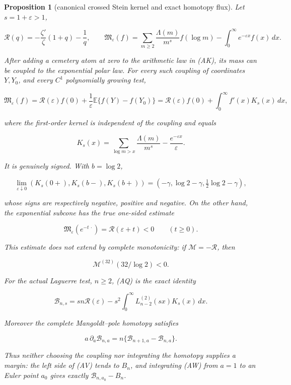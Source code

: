 \documentclass[11pt]{amsart}
\newtheorem{proposition}[theorem]{Proposition}
\theoremstyle{definition}
\theoremstyle{remark}
\theoremstyle{definition}
\begin{document}
\begin{proposition}[canonical crossed Stein kernel and exact homotopy flux]
\label{prop:a1-crossed-stein-flow}
Let $s=1+\varepsilon>1$,

\[
 \mathcal R(q)=-\frac{\zeta'}\zeta(1+q)-\frac1q,
 \qquad
 \mathfrak M_\varepsilon(f)
 =\sum_{m\ge2}\frac{\Lambda(m)}{m^s}f(\log m)
  -\int_0^\infty e^{-\varepsilon x}f(x)\,dx .              \tag{AP}
\]

After adding a cemetery atom at zero to the arithmetic law in (AK), its
mass can be coupled to the exponential polar law.  For every such coupling
of coordinates $Y,Y_0$, and every $C^1$ polynomially growing test,

\[
 \mathfrak M_\varepsilon(f)
 =\mathcal R(\varepsilon)f(0)
   +\frac1\varepsilon\mathbb E\{f(Y)-f(Y_0)\}
 =\mathcal R(\varepsilon)f(0)+\int_0^\infty f'(x)K_s(x)\,dx, \tag{AQ}
\]

where the first-order kernel is independent of the coupling and equals

\[
 K_s(x)=\sum_{\log m>x}\frac{\Lambda(m)}{m^s}
       -\frac{e^{-\varepsilon x}}\varepsilon .             \tag{AR}
\]

It is genuinely signed.  With $b=\log2$,

\[
 \lim_{\varepsilon\downarrow0}
 (K_s(0+),K_s(b-),K_s(b+))
 =(-\gamma,\log2-\gamma,\tfrac12\log2-\gamma),            \tag{AS}
\]

whose signs are respectively negative, positive and negative.  On the
other hand, the exponential subcone has the true one-sided estimate

\[
 \mathfrak M_\varepsilon(e^{-t\,\cdot})
 =\mathcal R(\varepsilon+t)<0\qquad(t\ge0).                \tag{AT}
\]

This estimate does not extend by complete monotonicity: if
$\mathcal M=-\mathcal R$, then

\[
 \mathcal M^{(32)}(32/\log2)<0.                             \tag{AU}
\]

For the actual Laguerre test, $n\ge2$, (AQ) is the exact identity

\[
 \mathcal B_{n,s}
 =sn\mathcal R(\varepsilon)
  -s^2\int_0^\infty L_{n-2}^{(2)}(sx)K_s(x)\,dx .          \tag{AV}
\]

Moreover the complete Mangoldt--pole homotopy satisfies

\[
 a\,\partial_a\mathcal B_{n,a}
 =n\{\mathcal B_{n+1,a}-\mathcal B_{n,a}\}.               \tag{AW}
\]

Thus neither choosing the coupling nor integrating the homotopy supplies
a margin: the left side of (AV) tends to $B_n$, and integrating (AW)
from $a=1$ to an Euler point $a_0$ gives exactly
$\mathcal B_{n,a_0}-B_n$.
\end{proposition}
\end{document}

